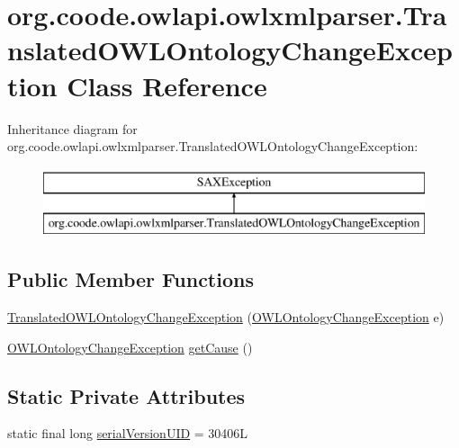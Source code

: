\hypertarget{classorg_1_1coode_1_1owlapi_1_1owlxmlparser_1_1_translated_o_w_l_ontology_change_exception}{\section{org.\-coode.\-owlapi.\-owlxmlparser.\-Translated\-O\-W\-L\-Ontology\-Change\-Exception Class Reference}
\label{classorg_1_1coode_1_1owlapi_1_1owlxmlparser_1_1_translated_o_w_l_ontology_change_exception}
}
Inheritance diagram for org.\-coode.\-owlapi.\-owlxmlparser.\-Translated\-O\-W\-L\-Ontology\-Change\-Exception\-:\begin{figure}[H]
\begin{center}
\leavevmode
\includegraphics[height=2.000000cm]{classorg_1_1coode_1_1owlapi_1_1owlxmlparser_1_1_translated_o_w_l_ontology_change_exception}
\end{center}
\end{figure}
\subsection*{Public Member Functions}
\begin{DoxyCompactItemize}
\item 
\hyperlink{classorg_1_1coode_1_1owlapi_1_1owlxmlparser_1_1_translated_o_w_l_ontology_change_exception_adf719139009cfdafa5966cbbff1bd903}{Translated\-O\-W\-L\-Ontology\-Change\-Exception} (\hyperlink{classorg_1_1semanticweb_1_1owlapi_1_1model_1_1_o_w_l_ontology_change_exception}{O\-W\-L\-Ontology\-Change\-Exception} e)
\item 
\hyperlink{classorg_1_1semanticweb_1_1owlapi_1_1model_1_1_o_w_l_ontology_change_exception}{O\-W\-L\-Ontology\-Change\-Exception} \hyperlink{classorg_1_1coode_1_1owlapi_1_1owlxmlparser_1_1_translated_o_w_l_ontology_change_exception_ab51e1d67d3b2f70fb9951dfc2926ca13}{get\-Cause} ()
\end{DoxyCompactItemize}
\subsection*{Static Private Attributes}
\begin{DoxyCompactItemize}
\item 
static final long \hyperlink{classorg_1_1coode_1_1owlapi_1_1owlxmlparser_1_1_translated_o_w_l_ontology_change_exception_a9f7188d2bb32640c53b330869565a44b}{serial\-Version\-U\-I\-D} = 30406\-L
\end{DoxyCompactItemize}


